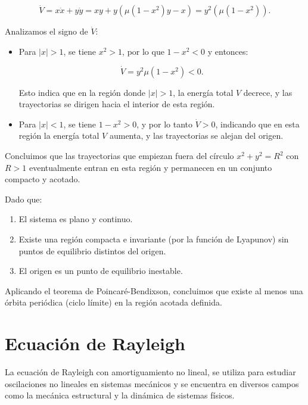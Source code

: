 \documentclass[12pt, a4paper]{report}
\begin{document}
\begin{equation}
    \dot{V} = x \dot{x} + y \dot{y} = x y + y \left( \mu (1 - x^2) y - x \right) = y^2 \left( \mu (1 - x^2) \right).
\end{equation}

Analizamos el signo de \( \dot{V} \):

\begin{itemize}
    \item Para \( |x| > 1 \), se tiene \( x^2 > 1 \), por lo que \( 1 - x^2 < 0 \) y entonces:

    \begin{equation}
        \dot{V} = y^2 \mu (1 - x^2) < 0.
    \end{equation}

    Esto indica que en la región donde \( |x| > 1 \), la energía total \( V \) decrece, y las trayectorias se dirigen hacia el interior de esta región.

    \item Para \( |x| < 1 \), se tiene \( 1 - x^2 > 0 \), y por lo tanto \( \dot{V} > 0 \), indicando que en esta región la energía total \( V \) aumenta, y las trayectorias se alejan del origen.
\end{itemize}

Concluimos que las trayectorias que empiezan fuera del círculo \( x^2 + y^2 = R^2 \) con \( R > 1 \) eventualmente entran en esta región y permanecen en un conjunto compacto y acotado.

Dado que:

\begin{enumerate}
    \item El sistema es plano y continuo.
    \item Existe una región compacta e invariante (por la función de Lyapunov) sin puntos de equilibrio distintos del origen.
    \item El origen es un punto de equilibrio inestable.
\end{enumerate}

Aplicando el teorema de Poincaré-Bendixson, concluimos que existe al menos una órbita periódica (ciclo límite) en la región acotada definida.

\section{Ecuación de Rayleigh}
La ecuación de Rayleigh con amortiguamiento no lineal, se utiliza
para estudiar oscilaciones no lineales en sistemas mecánicos y se encuentra en
diversos campos como la mecánica estructural y la dinámica de sistemas físicos.
\end{document}
